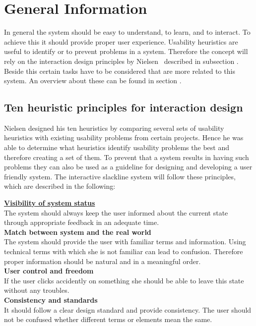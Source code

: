 \section{General Information}\label{4_1_general}
In general the system should be easy to understand, to learn, and to interact. To achieve this it should provide proper user experience. Usability heuristics are useful to identify or to prevent problems in a system. Therefore the concept will rely on the interaction design principles by Nielsen~\cite{Nielsen_1994-he} described in subsection \textit{}. Beside this certain tasks have to be considered that are more related to this system. An overview about these can be found in section \textit{}.

\subsection{Ten heuristic principles for interaction design}\label{nielsenDesignPrinciples}
Nielsen designed his ten heuristics by comparing several sets of usability heuristics with existing usability problems from certain projects. Hence he was able to determine what heuristics identify usability problems the best and therefore creating a set of them. To prevent that a system results in having such problems they can also be used as a guideline for designing and developing a user friendly system. The interactive slackline system will follow these principles, which are described in the following:

\textbf{\hyperref[4_1_1_visibilitySystemStatus]{Visibility of system status}}\\
The system should always keep the user informed about the current state through appropriate feedback in an adequate time.\\

\textbf{Match between system and the real world}\\
The system should provide the user with familiar terms and information. Using technical terms with which she is not familiar can lead to confusion. Therefore proper information should be natural and in a meaningful order.\\

\textbf{User control and freedom}\\
If the user clicks accidently on something she should be able to leave this state without any troubles.\\

\textbf{Consistency and standards}\\
It should follow a clear design standard and provide consistency. The user should not be confused whether different terms or elements mean the same.\\

